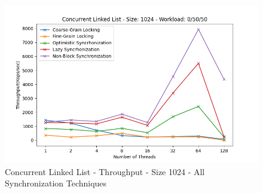 \documentclass[../final_report.tex]{subfiles}
\begin{document}
\begin{figure}[H]
        \includegraphics[scale=0.4]{outFiles/plots/concurrent_data_structs_all_1024_0_50_50.png}
    \caption{Concurrent Linked List - Throughput - Size 1024 - All Synchronization Techniques}
    \label{fig:Concurrent Linked List - Throughput - Size 1024 - All Synchronization Techniques}
\end{figure}
\end{document}
